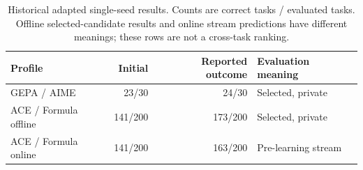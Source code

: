 \begin{table}[t]
\caption{Historical adapted single-seed results. Counts are correct tasks / evaluated tasks. Offline selected-candidate results and online stream predictions have different meanings; these rows are not a cross-task ranking.}
\label{tab:historical}
\small
\centering
\begin{tabular}{@{}lrrl@{}}
\toprule
Profile & Initial & Reported outcome & Evaluation meaning \\
\midrule
GEPA / AIME & 23/30 & 24/30 & Selected, private \\
ACE / Formula offline & 141/200 & 173/200 & Selected, private \\
ACE / Formula online & 141/200 & 163/200 & Pre-learning stream \\
\bottomrule
\end{tabular}
\end{table}
